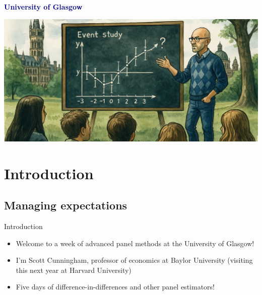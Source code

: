 \documentclass{beamer}
\begin{document}
\vspace*{2em} %
\begin{center}
    {\Huge\textbf{\textcolor{navy}{University of Glasgow \\ }}}
    
    \vspace{2em} %
    \includegraphics[width=0.9\linewidth]{./lecture_includes/banner_cropped} %
\end{center}


\section{Introduction}

\subsection{Managing expectations}


\begin{frame}{Introduction}

\begin{itemize}
\item Welcome to a week of advanced panel methods at the University of Glasgow!
\item I'm Scott Cunningham, professor of economics at Baylor University (visiting this next year at Harvard University)
\item Five days of difference-in-differences and other panel estimators!
\end{itemize}

\end{frame}
\end{document}
